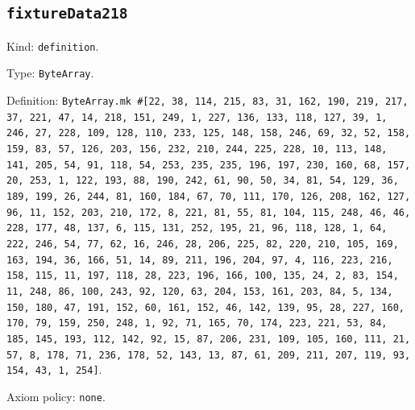 \documentclass[11pt]{article}
\begin{document}
\subsection*{\texttt{fixtureData218}}
\noindent Kind: \texttt{definition}.\par
\noindent Type: \texttt{ByteArray}.\par
\noindent Definition: \texttt{ByteArray.mk \#[22, 38, 114, 215, 83, 31, 162, 190, 219, 217, 37, 221, 47, 14, 218, 151, 249, 1, 227, 136, 133, 118, 127, 39, 1, 246, 27, 228, 109, 128, 110, 233, 125, 148, 158, 246, 69, 32, 52, 158, 159, 83, 57, 126, 203, 156, 232, 210, 244, 225, 228, 10, 113, 148, 141, 205, 54, 91, 118, 54, 253, 235, 235, 196, 197, 230, 160, 68, 157, 20, 253, 1, 122, 193, 88, 190, 242, 61, 90, 50, 34, 81, 54, 129, 36, 189, 199, 26, 244, 81, 160, 184, 67, 70, 111, 170, 126, 208, 162, 127, 96, 11, 152, 203, 210, 172, 8, 221, 81, 55, 81, 104, 115, 248, 46, 46, 228, 177, 48, 137, 6, 115, 131, 252, 195, 21, 96, 118, 128, 1, 64, 222, 246, 54, 77, 62, 16, 246, 28, 206, 225, 82, 220, 210, 105, 169, 163, 194, 36, 166, 51, 14, 89, 211, 196, 204, 97, 4, 116, 223, 216, 158, 115, 11, 197, 118, 28, 223, 196, 166, 100, 135, 24, 2, 83, 154, 11, 248, 86, 100, 243, 92, 120, 63, 204, 153, 161, 203, 84, 5, 134, 150, 180, 47, 191, 152, 60, 161, 152, 46, 142, 139, 95, 28, 227, 160, 170, 79, 159, 250, 248, 1, 92, 71, 165, 70, 174, 223, 221, 53, 84, 185, 145, 193, 112, 142, 92, 15, 87, 206, 231, 109, 105, 160, 111, 21, 57, 8, 178, 71, 236, 178, 52, 143, 13, 87, 61, 209, 211, 207, 119, 93, 154, 43, 1, 254]}.\par
\noindent Axiom policy: \texttt{none}.\par
\end{document}
